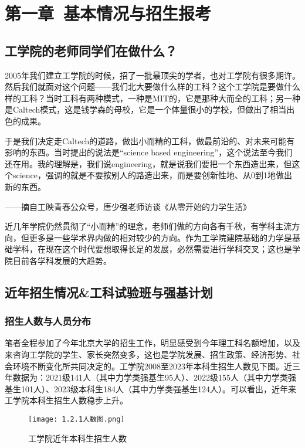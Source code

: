 \documentclass[11pt,oneside]{book}
\begin{document}
\tableofcontents

\mainmatter

\chapter{第一章\ 基本情况与招生报考}
\section{工学院的老师同学们在做什么？}
2005年我们建立工学院的时候，招了一批最顶尖的学者，也对工学院有很多期许。然后我们就面对这个问题——我们北大要做什么样的工科？这个工学院是要做什么样的工科？当时工科有两种模式，一种是MIT的，它是那种大而全的工科；另一种是Caltech模式，这是钱学森的母校，它是一个体量很小的学校，但做出了相当出色的成果。

于是我们决定走Caltech的道路，做出小而精的工科，做最前沿的、对未来可能有影响的东西。当时提出的说法是“science based engineering”，这个说法至今我们还在用。我的理解是，我们说engineering，就是说我们要把一个东西造出来，但这个science，强调的就是不要按别人的路造出来，而是要创新性地、从0到1地做出新的东西。
\begin{flushright}
    ——摘自工映青春公众号，唐少强老师访谈《从零开始的力学生活》

\end{flushright}

近几年学院仍然贯彻了“小而精”的理念，老师们做的方向各有千秋，有学科主流方向，但更多是一些学术界内做的相对较少的方向。作为工学院建院基础的力学是基础学科，在现在这个时代要想取得长足的发展，必然需要进行学科交叉；这也是学院目前各学科发展的大趋势。

\section{近年招生情况\&工科试验班与强基计划}    
\subsection{招生人数与人员分布}
笔者全程参加了今年北京大学的招生工作，明显感受到今年理工科名额增加，以及来咨询工学院的学生、家长突然变多，这也是学院发展、招生政策、经济形势、社会环境不断变化所共同决定的。工学院2008至2023年本科生招生人数见下图。近三年数据为：2021级141人（其中力学类强基生95人）、2022级155人（其中力学类强基生101人）、2023级本科生184人（其中力学类强基生124人）。可以看出，近年来工学院本科生招生人数稳步上升。

\begin{figure}[htbp]
    \centering
    \texttt{[image: 1.2.1人数图.png]}
    \renewcommand{\figurename}{图}
    \caption{工学院近年本科生招生人数}
    \label{fig:enter-label}
\end{figure}
        
\end{document}
